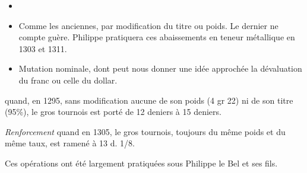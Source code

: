 \documentclass[french,twoside]{book} %
\begin{document}
\begin{itemize}[itemsep=0pt,]
\item[] \hspace{-1.5em}{\bfseries Désormais, deux catégories de mutations sont possibles :}
\item Comme les anciennes, par modification du titre ou poids. Le dernier ne compte guère. Philippe pratiquera ces abaissements en teneur métallique en 1303 et 1311.
\item Mutation nominale, dont peut nous donner une idée approchée la dévaluation du franc ou celle du dollar.
\end{itemize}
 quand, en 1295, sans modification aucune de son poids (4 gr 22) ni de son titre (95\%), le gros tournois est porté de 12 deniers à 15 deniers.\par
\label{p92}{\itshape Renforcement} quand en 1305, le gros tournois, toujours du même poids et du même taux, est ramené à 13 d. 1/8.\par
Ces opérations ont été largement pratiquées sous Philippe le Bel et ses fils.\par
\end{document}
